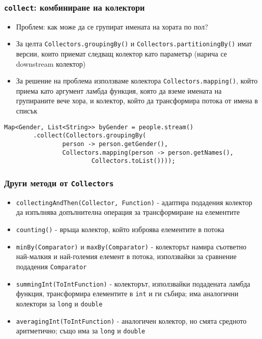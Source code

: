 \documentclass[ignorenonframetext, hyperref=unicode,compress,pdflatex]{beamer}
\begin{document}
\begin{frame}[containsverbatim]\frametitle{\lstinline{collect}: комбиниране на
колектори}
\begin{itemize}
  \item Проблем: как може да се групират имената на хората по пол? 
  \item За целта \lstinline{Collectors.groupingBy()} и
  \lstinline{Collectors.partitioningBy()} имат версии, които приемат следващ
  колектор като параметър (нарича се downstream колектор)
  \item За решение на проблема използваме колектора
  \lstinline{Collectors.mapping()}, който приема като аргумент ламбда
  функция, която да вземе имената на групираните вече хора, и колектор,
  който да трансформира потока от имена в списък
\end{itemize}
\begin{lstlisting}
Map<Gender, List<String>> byGender = people.stream()
		.collect(Collectors.groupingBy(
				person -> person.getGender(),
				Collectors.mapping(person -> person.getNames(),
						Collectors.toList())));
\end{lstlisting}
\end{frame}

\begin{frame}[containsverbatim]\frametitle{Други методи от
\lstinline{Collectors}}
\begin{itemize}
  \item \lstinline{collectingAndThen(Collector, Function)} - 
  адаптира подадения колектор да изпълнява допълнителна операция за
  трансформиране на елементите
  \item \lstinline{counting()} - връща колектор, който изброява елементите в
  потока
  \item \lstinline{minBy(Comparator)} и \lstinline{maxBy(Comparator)} -
  колекторът намира съответно най-малкия и най-големия елемент в потока,
  използвайки за сравнение подадения \lstinline{Comparator}
  \item \lstinline{summingInt(ToIntFunction)} - колекторът, използвайки
  подадената ламбда функция, трансформира елементите в \lstinline{int} и ги
  събира; има аналогични колектори за \lstinline{long} и \lstinline{double}
  \item \lstinline{averagingInt(ToIntFunction)} - аналогичен колектор, но
  смята средното аритметично; също има за \lstinline{long} и \lstinline{double}
\end{itemize}
\end{frame}
\end{document}
